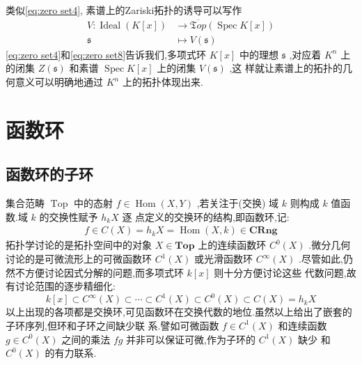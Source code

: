 类似\eqref{eq:zero set4}, 素谱上的Zariski拓扑的诱导可以写作
\begin{equation}\label{eq:zero set8}
\begin{aligned}
V: \operatorname{Ideal}(K[x]) & \rightarrow \overline{\mathfrak{T} o p}(\operatorname{Spec} K[x]) \\
\mathfrak{s} & \mapsto V(\mathfrak{s})
\end{aligned}
\end{equation}
\eqref{eq:zero set4}和\eqref{eq:zero set8}告诉我们,多项式环 $K[x]$ 中的理想 $\mathfrak{s}$ ,对应着 $K^n$ 上的闭集 $Z(\mathfrak{s})$ 和素谱 $\operatorname{Spec} K[x]$ 上的闭集 $V(\mathfrak{s})$ ,这 样就让素谱上的拓扑的几何意义可以明确地通过 $K^n$ 上的拓扑体现出来.
\clearpage
\section{函数环}
\subsection{函数环的子环}
集合范畴 $\operatorname{Top}$ 中的态射 $f \in \operatorname{Hom}(X, Y)$ ,若关注于(交换) 域 $k$ 则构成 $k$ 值函数.域 $k$ 的交换性赋予 $h_k X$ 逐 点定义的交换环的结构,即函数环,记:
\begin{align*}
f \in C(X)=h_k X=\operatorname{Hom}(X, k) \in \mathbf{C R n g}
\end{align*}
拓扑学讨论的是拓扑空间中的对象 $X \in \mathbf{T o p}$ 上的连续函数环 $C^0(X)$ .微分几何讨论的是可微流形上的可微函数环 $C^1(X)$ 或光滑函数环 $C^{\infty}(X)$ .尽管如此,仍然不方便讨论因式分解的问题,而多项式环 $k[x]$ 则十分方便讨论这些 代数问题,故有讨论范围的逐步精细化:
\begin{equation}\label{eq: function ring1}
k[x] \subset C^{\infty}(X) \subset \cdots \subset C^1(X) \subset C^0(X) \subset C(X)=h_k X
\end{equation}
以上出现的各项都是交换环,可见函数环在交换代数的地位.虽然以上给出了嵌套的子环序列,但环和子环之间缺少联 系.譬如可微函数 $f \in C^1(X)$ 和连续函数 $g \in C^0(X)$ 之间的乘法 $f g$ 并非可以保证可微,作为子环的 $C^1(X)$ 缺少 和 $C^0(X)$ 的有力联系.
